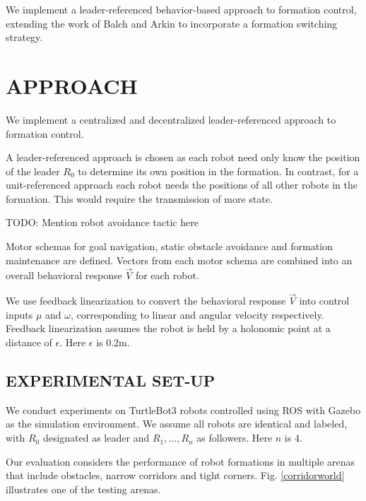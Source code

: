 \documentclass[letterpaper, 10 pt, conference]{ieeeconf}  %
\begin{document}
We implement a leader-referenced behavior-based approach to formation control, extending the work of Balch and Arkin to incorporate a formation switching strategy.

\section{APPROACH}

We implement a centralized and decentralized leader-referenced approach to formation control. 

A leader-referenced approach is chosen as each robot need only know the position of the leader $R_0$ to determine its own position in the formation. In contrast, for a unit-referenced approach each robot needs the positions of all other robots in the formation. This would require the transmission of more state.

TODO: Mention robot avoidance tactic here

Motor schemas for goal navigation, static obstacle avoidance and formation maintenance are defined. Vectors from each motor schema are combined into an overall behavioral response $\vec{V}$ for each robot.

We use feedback linearization to convert the behavioral response $\vec{V}$ into control inputs $\mu$ and $\omega$, corresponding to linear and angular velocity respectively. Feedback linearization assumes the robot is held by a holonomic point at a distance of $\epsilon$. Here $\epsilon$ is 0.2m.

\subsection{EXPERIMENTAL SET-UP}

We conduct experiments on TurtleBot3 \cite{turtlebot} robots controlled using ROS \cite{ros} with Gazebo \cite{gazebo} as the simulation environment. We assume all robots are identical and labeled, with $R_0$ designated as leader and $R_1,...,R_n$ as followers. Here $n$ is 4.

Our evaluation considers the performance of robot formations in multiple arenas that include obstacles, narrow corridors and tight corners. Fig. \ref{corridorworld} illustrates one of the testing arenas.
\end{document}

